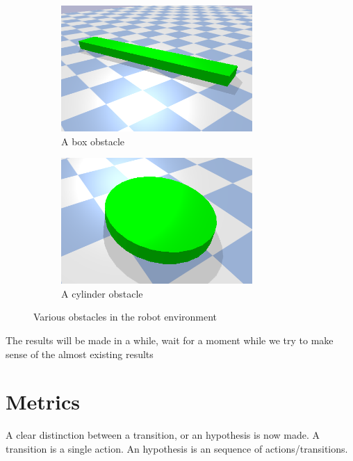 \begin{figure}[H]
    \centering
    \begin{subfigure}{.5\textwidth}
    \centering
    \includegraphics[width=0.8\textwidth]{figures/box_obstacle.png}
    \caption{A box obstacle}
    \end{subfigure}%
    \begin{subfigure}{.5\textwidth}
    \centering
    \includegraphics[width=0.8\textwidth]{figures/cylinder_obstacle.png}
    \caption{A cylinder obstacle}
    \end{subfigure}%
    \caption{Various obstacles in the robot environment}
    \label{fig:example_obstacles_change_this_label}
\end{figure}



The results will be made in a while, wait for a moment while we try to make sense of the almost existing results



\section{Metrics}

A clear distinction between a transition, or an hypothesis is now made. A transition is a single action. An hypothesis is an sequence of actions/transitions.\\


